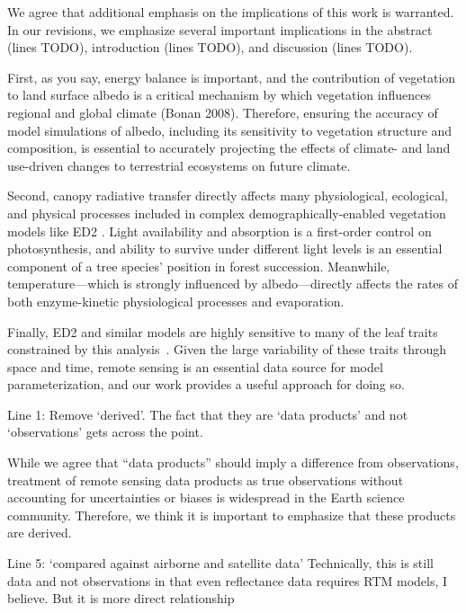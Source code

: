We agree that additional emphasis on the implications of this work is warranted.
In our revisions, we emphasize several important implications in the abstract (lines TODO), introduction (lines TODO), and discussion (lines TODO).

First, as you say, energy balance is important, and the contribution of vegetation to land surface albedo is a critical mechanism by which vegetation influences regional and global climate (Bonan 2008). Therefore, ensuring the accuracy of model simulations of albedo, including its sensitivity to vegetation structure and composition, is essential to accurately projecting the effects of climate- and land use-driven changes to terrestrial ecosystems on future climate.

Second, canopy radiative transfer directly affects many physiological, ecological, and physical processes included in complex demographically-enabled vegetation models like ED2 \citep{viskari_2019_influence}.
Light availability and absorption is a first-order control on photosynthesis, and ability to survive under different light levels is an essential component of a tree species’ position in forest succession.
Meanwhile, temperature---which is strongly influenced by albedo---directly affects the rates of both enzyme-kinetic physiological processes and evaporation.

Finally, ED2 and similar models are highly sensitive to many of the leaf traits constrained by this analysis~\citep{raczka_2018_what, dietze2014quantitative, shiklomanov2020structurea}.
Given the large variability of these traits through space and time, remote sensing is an essential data source for model parameterization, and our work provides a useful approach for doing so.

\begin{reviewer}
  Line 1: Remove ‘derived’. The fact that they are ‘data products’ and not ‘observations’ gets across the point.
\end{reviewer}

While we agree that “data products” should imply a difference from observations, treatment of remote sensing data products as true observations without accounting for uncertainties or biases is widespread in the Earth science community.
Therefore, we think it is important to emphasize that these products are derived.

\begin{reviewer}
  Line 5: ‘compared against airborne and satellite data’ Technically, this is still data and not observations in that even reflectance data requires RTM models, I believe. But it is more direct relationship
\end{reviewer}

